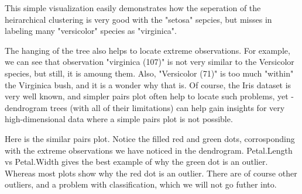 \documentclass[shortnames,nojss,article]{jss}\usepackage[]{graphicx}\usepackage[]{color}
\begin{document}
This simple visualization easily demonstrates how the seperation of the heirarchical clustering is very good with the "setosa" sepcies, but misses in labeling many "versicolor" species as "virginica".

The hanging of the tree also helps to locate extreme observations. For example, we can see that observation "virginica (107)" is not very similar to the Versicolor species, but still, it is amoung them. Also, "Versicolor (71)" is too much "within" the Virginica bush, and it is a wonder why that is.  Of course, the Iris dataset is very well known, and simpler pairs plot often help to locate such problems, yet - dendrogram trees (with all of their limitations) can help gain insights for very high-dimensional data where a simple pairs plot is not possible.

Here is the similar pairs plot. Notice the filled red and green dots, corrosponding with the extreme observations we have noticed in the dendrogram. Petal.Length vs Petal.Width gives the best example of why the green dot is an outlier. Whereas most plots show why the red dot is an outlier. There are of course other outliers, and a problem with classification, which we will not go futher into.
\end{document}
